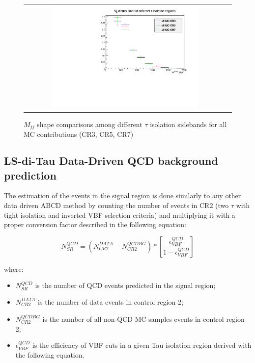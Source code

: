   \begin{figure}[tbh!]
      \centering
      \begin{tabular}{cc}
        \includegraphics[width=0.75\textwidth]{PLOTS/diTauHadLSotherPlots/LS_mjjshapestab_vs_tauiso_mc.pdf}
      \end{tabular}
      \caption{$M_{jj}$ shape comparisons among different $\tau$ isolation sidebands for all MC contributions (CR3, CR5, CR7)}
      \label{fig:LS_mjjshapestab_vs_tauiso_mc}
    \end{figure}

\subsection {LS-di-Tau Data-Driven QCD background prediction} \label{sec:bgestimation}

The estimation of the events in the signal region is done similarly to any other data driven ABCD method by counting the number of events in CR2 (two $\tau$ with tight isolation and inverted VBF selection criteria) and multiplying it with a proper conversion factor described in the following equation:

\begin{equation}
N^{QCD}_{SR} = \left( N^{DATA}_{CR2} - N^{\overline{QCD} BG}_{CR2} \right) * \left[ \frac{\epsilon^{QCD}_{VBF}}{1 - \epsilon^{QCD}_{VBF}} \right]
\label{eq:qcdbgpred}
\end{equation}

where:

\begin{itemize}
\item $N^{QCD}_{SR}$ is the number of QCD events predicted in the signal region;
\item  $N^{DATA}_{CR2}$ is the number of data events in control region 2;
\item $N^{\overline{QCD} BG}_{CR2}$ is the number of all non-QCD MC samples events in control region 2;
\item $\epsilon^{QCD}_{VBF}$ is the efficiency of VBF cuts in a given Tau isolation region derived with the following equation.
\end{itemize}

